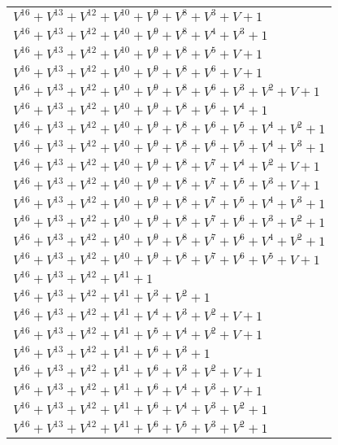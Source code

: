 \documentclass[12pt]{article}
\begin{document}
\begin{adjustwidth}{-4cm}{}
\begin{center}
\begin{longtable}{|l|}
$V^{16}  +V^{13}  +V^{12}  +V^{10}  +V^{9}  +V^{8}  +V^{3}  + V + 1$ \\
$V^{16}  +V^{13}  +V^{12}  +V^{10}  +V^{9}  +V^{8}  +V^{4}  +V^{3}  + 1$ \\
$V^{16}  +V^{13}  +V^{12}  +V^{10}  +V^{9}  +V^{8}  +V^{5}  + V + 1$ \\
$V^{16}  +V^{13}  +V^{12}  +V^{10}  +V^{9}  +V^{8}  +V^{6}  + V + 1$ \\
$V^{16}  +V^{13}  +V^{12}  +V^{10}  +V^{9}  +V^{8}  +V^{6}  +V^{3}  +V^{2}  + V + 1$ \\
$V^{16}  +V^{13}  +V^{12}  +V^{10}  +V^{9}  +V^{8}  +V^{6}  +V^{4}  + 1$ \\
$V^{16}  +V^{13}  +V^{12}  +V^{10}  +V^{9}  +V^{8}  +V^{6}  +V^{5}  +V^{4}  +V^{2}  + 1$ \\
$V^{16}  +V^{13}  +V^{12}  +V^{10}  +V^{9}  +V^{8}  +V^{6}  +V^{5}  +V^{4}  +V^{3}  + 1$ \\
$V^{16}  +V^{13}  +V^{12}  +V^{10}  +V^{9}  +V^{8}  +V^{7}  +V^{4}  +V^{2}  + V + 1$ \\
$V^{16}  +V^{13}  +V^{12}  +V^{10}  +V^{9}  +V^{8}  +V^{7}  +V^{5}  +V^{3}  + V + 1$ \\
$V^{16}  +V^{13}  +V^{12}  +V^{10}  +V^{9}  +V^{8}  +V^{7}  +V^{5}  +V^{4}  +V^{3}  + 1$ \\
$V^{16}  +V^{13}  +V^{12}  +V^{10}  +V^{9}  +V^{8}  +V^{7}  +V^{6}  +V^{3}  +V^{2}  + 1$ \\
$V^{16}  +V^{13}  +V^{12}  +V^{10}  +V^{9}  +V^{8}  +V^{7}  +V^{6}  +V^{4}  +V^{2}  + 1$ \\
$V^{16}  +V^{13}  +V^{12}  +V^{10}  +V^{9}  +V^{8}  +V^{7}  +V^{6}  +V^{5}  + V + 1$ \\
$V^{16}  +V^{13}  +V^{12}  +V^{11}  + 1$ \\
$V^{16}  +V^{13}  +V^{12}  +V^{11}  +V^{3}  +V^{2}  + 1$ \\
$V^{16}  +V^{13}  +V^{12}  +V^{11}  +V^{4}  +V^{3}  +V^{2}  + V + 1$ \\
$V^{16}  +V^{13}  +V^{12}  +V^{11}  +V^{5}  +V^{4}  +V^{2}  + V + 1$ \\
$V^{16}  +V^{13}  +V^{12}  +V^{11}  +V^{6}  +V^{3}  + 1$ \\
$V^{16}  +V^{13}  +V^{12}  +V^{11}  +V^{6}  +V^{3}  +V^{2}  + V + 1$ \\
$V^{16}  +V^{13}  +V^{12}  +V^{11}  +V^{6}  +V^{4}  +V^{3}  + V + 1$ \\
$V^{16}  +V^{13}  +V^{12}  +V^{11}  +V^{6}  +V^{4}  +V^{3}  +V^{2}  + 1$ \\
$V^{16}  +V^{13}  +V^{12}  +V^{11}  +V^{6}  +V^{5}  +V^{3}  +V^{2}  + 1$ \\

\end{longtable}
\end{center}
\end{adjustwidth}
\end{document}
